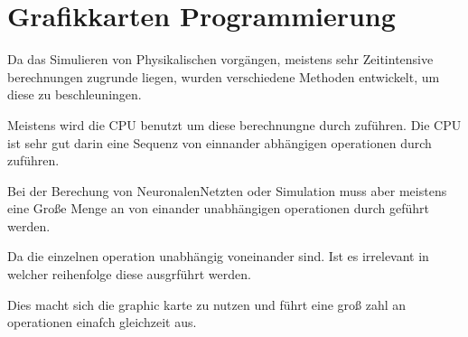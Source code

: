 
\section{Grafikkarten Programmierung}

Da das Simulieren von Physikalischen vorgängen, meistens sehr Zeitintensive berechnungen zugrunde liegen, wurden verschiedene Methoden entwickelt, um diese zu beschleuningen.

Meistens wird die CPU benutzt um diese berechnungne durch zuführen.
Die CPU ist sehr gut darin eine Sequenz von einnander abhängigen operationen durch zuführen.

Bei der Berechung von NeuronalenNetzten oder Simulation muss aber meistens eine Große Menge 
an von einander unabhängigen operationen durch geführt werden.

Da die einzelnen operation unabhängig voneinander sind.
Ist es irrelevant in welcher reihenfolge diese ausgrführt werden.

Dies macht sich die graphic karte zu nutzen und führt eine groß zahl an operationen einafch gleichzeit aus.






% 